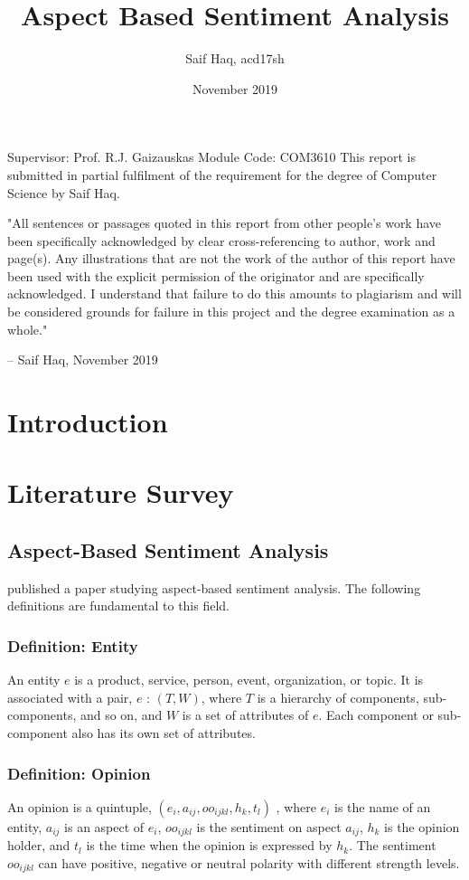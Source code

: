 \documentclass[11pt]{article}
\title{Aspect Based Sentiment Analysis}
\author{Saif Haq, acd17sh}
\date{November 2019}
\begin{document}
\maketitle 
Supervisor: Prof. R.J. Gaizauskas\newline
Module Code: COM3610\newline
This report is submitted in partial fulfilment of the requirement for the degree of Computer Science by Saif Haq.\newline\newline


"All sentences or passages quoted in this report from other people's work have been specifically acknowledged by clear cross-referencing to author, work and page(s). Any illustrations that are not the work of the author of this report have been used with the explicit permission of the originator and are specifically acknowledged. I understand that failure to do this amounts to plagiarism and will be considered grounds for failure in this project and the degree examination as a whole."

-- Saif Haq, November 2019

\newpage
\tableofcontents
\newpage
\section{Introduction}
\section{Literature Survey}
\subsection{Aspect-Based Sentiment Analysis}
\textcolor{cite}{\citet{liu}} published a paper studying aspect-based sentiment analysis. The following definitions are fundamental to this field. 
\subsubsection{Definition: Entity} \label{def_entity}
An entity {$e$} is a product, service, person, event, organization, or topic. It is associated with a pair, $e$ : $(T,W)$, where $T$ is a hierarchy of components, sub-components, and so on, and $W$ is a set of attributes of $e$. Each component or sub-component also has its own set of attributes.

\subsubsection{Definition: Opinion} \label{def_opinion}
An opinion is a quintuple, $(e_i, a_{ij} , oo_{ijkl}, h_k, t_l)$
, where $e_i$ is the name of an entity, $a_{ij}$ is an aspect of $e_i$, $oo_{ijkl}$ is the sentiment on aspect $a_{ij}$, $h_k$ is the opinion holder, and $t_l$ is the time when the opinion is expressed by $h_k$. The sentiment $oo_{ijkl}$ can have positive, negative or neutral polarity with different strength levels. 
\end{document}

